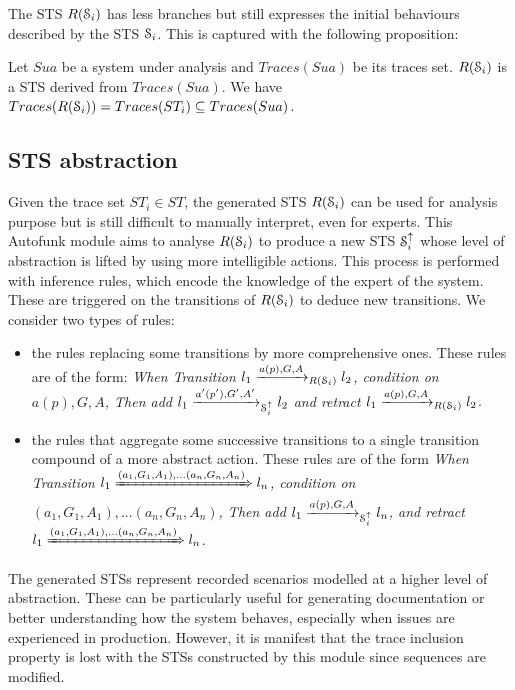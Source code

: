 The STS $R(\EuScript{S}_i)$ has less branches but still expresses
the initial behaviours described by the STS $\EuScript{S}_i$.
This is captured with the following proposition:

\begin{proposition}
  Let $Sua$ be a system under analysis and $Traces(Sua)$ be its traces
  set. $R(\EuScript{S}_i)$ is a STS derived from $Traces(Sua)$.
  We have $Traces(R(\EuScript{S}_i)) = Traces(ST_i) \subseteq Traces(Sua)$.
\end{proposition}

\subsection{STS abstraction}

Given the trace set $ST_i \in ST$, the generated STS
$R(\EuScript{S}_i)$ can be used for analysis purpose but is still
difficult to manually interpret, even for experts.  This Autofunk
module aims to analyse $R(\EuScript{S}_i)$ to produce a new STS
$\EuScript{S}_i^\uparrow$ whose level of abstraction is lifted by
using more intelligible actions. This process is performed with
inference rules, which encode the knowledge of the expert of the
system. These are triggered on the transitions of
$R(\EuScript{S}_i)$ to deduce new transitions. We consider two
types of rules:

\begin{itemize}
    \item the rules replacing some transitions by more
    comprehensive ones. These rules are of the form: \textit{When
    Transition $l_1 \xrightarrow{a(p),G,A}_{R(\EuScript{S}_i)}
    l_2$, condition on $a(p),G,A$, Then add $l_1
    \xrightarrow{a'(p'),G',A'}_{\EuScript{S}_i^\uparrow} l_2$ and
    retract $l_1 \xrightarrow{a(p),G,A}_{R(\EuScript{S}_i)} l_2$}.

    \item the rules that aggregate some successive transitions
    to a single transition compound of a more abstract action.
    These rules are of the form \textit{When Transition $l_1
    \xRightarrow{(a_1,G_1,A_1),...(a_n,G_n,A_n)} l_n$, condition
    on $(a_1,G_1,A_1),...(a_n,G_n,A_n)$, Then add $l_1
    \xrightarrow{a(p),G,A}_{\EuScript{S}_i^\uparrow} l_n $, and
    retract $l_1 \xRightarrow{(a_1,G_1,A_1),...(a_n,G_n,A_n)} l_n$}.
\end{itemize}

The generated STSs represent recorded scenarios modelled at a
higher level of abstraction. These can be particularly useful for
generating documentation or better understanding how the system
behaves, especially when issues are experienced in production.
However, it is manifest that the trace inclusion property is lost
with the STSs constructed by this module since sequences are
modified.

